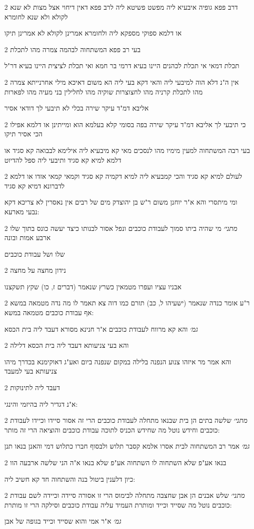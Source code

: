 \documentclass[12pt, openany]{book}
\newcommand{\sethebfont}{
\fontsize{10.5pt}{21.0pt} \selectfont
}
\newcommand{\twocol}[1]{
	{\sethebfont \begin{multicols}{2}
			#1
	\end{multicols}}	
}
\begin{document}
\twocol{דרב פפא גופיה איבעיא ליה מפשט פשיטא ליה לרב פפא דאין דיחוי אצל מצות לא שנא לקולא ולא שנא לחומרא
\par או דלמא ספוקי מספקא ליה ולחומרא אמרינן לקולא לא אמרינן תיקו}
\twocol{בעי רב פפא המשתחוה לבהמה צמרה מהו לתכלת
\par תכלת דמאי אי תכלת לכהנים היינו בעיא דרמי בר חמא ואי תכלת לציצית היינו בעיא דר"ל}
\twocol{אין ה"נ דלא הוה למיבעי ליה והאי דקא בעי ליה הא משום דאיכא מילי אחרנייתא צמרה מהו לתכלת קרניה מהו לחצוצרות שוקיה מהו לחלילין בני מעיה מהו לפארות
\par אליבא דמ"ד עיקר שירה בכלי לא תיבעי לך דודאי אסיר}
\twocol{כי תיבעי לך אליבא דמ"ד עיקר שירה בפה בסומי קלא בעלמא הוא ומייתינן או דלמא אפילו הכי אסיר תיקו
\par בעי רבה המשתחוה למעין מימיו מהו לנסכים מאי קא מיבעיא ליה אילימא לבבואה קא סגיד או דלמא למיא קא סגיד ותיבעי ליה ספל להדיוט}
\twocol{לעולם למיא קא סגיד והכי קמבעיא ליה למיא דקמיה קא סגיד וקמאי קמאי אזדו או דלמא לדברונא דמיא קא סגיד
\par ומי מיתסרי והא א"ר יוחנן משום ר"ש בן יהוצדק מים של רבים אין נאסרין לא צריכא דקא נבעי מארעא:}
\twocol{{\large\emph{מתני׳}} מי שהיה ביתו סמוך לעבודת כוכבים ונפל אסור לבנותו כיצד יעשה כונס בתוך שלו ארבע אמות ובונה
\par שלו ושל עבודת כוכבים}
\twocol{נידון מחצה על מחצה
\par אבניו עציו ועפרו מטמאין כשרץ שנאמר (דברים ז, כו) שקץ תשקצנו}
\twocol{ר"ע אומר כנדה שנאמר (ישעיהו ל, כב) תזרם כמו דוה צא תאמר לו מה נדה מטמאה במשא אף עבודת כוכבים מטמאה במשא:
\par {\large\emph{גמ׳}} והא קא מרווח לעבודת כוכבים א"ר חנינא מסורא דעבד ליה בית הכסא}
\twocol{והא בעי צניעותא דעבד ליה בית הכסא דלילה
\par והא אמר מר איזהו צנוע הנפנה בלילה במקום שנפנה ביום ואע"ג דאוקימנא בכדרך מיהו צניעותא בעי למעבד}
\twocol{דעבד ליה לתינוקות
\par א"נ דגדיר ליה בהיזמי והינגי:}
\twocol{{\large\emph{מתני׳}} שלשה בתים הן בית שבנאו מתחלה לעבודת כוכבים הרי זה אסור סיידו וכיידו לעבודת כוכבים וחידש נוטל מה שחידש הכניס לתוכה עבודת כוכבים והוציאה הרי זה מותר:
\par {\large\emph{גמ׳}} אמר רב המשתחוה לבית אסרו אלמא קסבר תלוש ולבסוף חברו כתלוש דמי והאנן בנאו תנן}
\twocol{בנאו אע"פ שלא השתחוה לו השתחוה אע"פ שלא בנאו א"ה הני שלשה ארבעה הוו
\par כיון דלענין ביטול בנה והשתחוה חד קא חשיב ליה:}
\twocol{{\large\emph{מתני׳}} שלש אבנים הן אבן שחצבה מתחלה לבימוס הרי זו אסורה סיידה וכיידה לשם עבודת כוכבים נוטל מה שסייד וכייד ומותרת העמיד עליה עבודת כוכבים וסילקה הרי זו מותרת:
\par {\large\emph{גמ׳}} א"ר אמי והוא שסייד וכייד בגופה של אבן}
\end{document}
